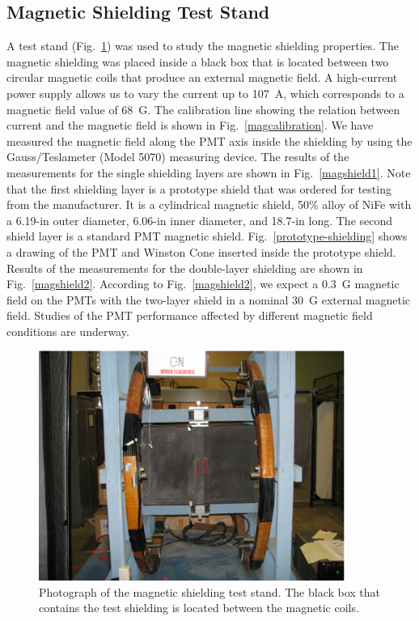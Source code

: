 \subsection{Magnetic Shielding Test Stand}

A test stand (Fig.~\ref{magstand}) was used to study the magnetic 
shielding properties.  The magnetic shielding was placed inside a black 
box that is located between two circular magnetic coils that produce an 
external magnetic field.  A high-current power supply allows us to vary 
the current up to 107~A, which corresponds to a magnetic field value of 
68~G.  The calibration line showing the relation between current and the 
magnetic field is shown in Fig.~\ref{magcalibration}.  We have measured 
the magnetic field along the PMT axis inside the shielding by using the 
Gauss/Teslameter (Model 5070) measuring device. The results of the 
measurements for the single shielding layers are shown in 
Fig.~\ref{magshield1}.  Note that the first shielding layer is a prototype 
shield that was ordered for testing from the manufacturer.  It is a 
cylindrical magnetic shield, 50\% alloy of NiFe with a 6.19-in outer 
diameter, 6.06-in inner diameter, and 18.7-in long.  The second shield layer 
is a standard PMT magnetic shield.  Fig.~\ref{prototype-shielding} shows a 
drawing of the PMT and Winston Cone inserted inside the prototype shield. 
Results of the measurements for the double-layer shielding are shown in 
Fig.~\ref{magshield2}.  According to Fig.~\ref{magshield2}, we expect a
0.3~G magnetic field on the PMTs with the two-layer shield in a nominal 
30~G external magnetic field.  Studies of the PMT performance affected 
by different magnetic field conditions are underway.

\begin{figure}
\hspace{0.5cm}
\begin{centering}
\includegraphics[height=7.5cm]{Magnetic-shielding/mag_stand.eps}
\vspace{0.5cm}
\caption{\small{Photograph of the magnetic shielding test stand.  The 
black box that contains the test shielding is located between the 
magnetic coils.}}
\label{magstand}
\end{centering}
\end{figure}

